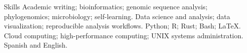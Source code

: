 
\begin{rubric}{Skills}
\entry*[Research]
	Academic writing; bioinformatics; genomic sequence analysis; phylogenomics; microbiology; self-learning.
\entry*[Data]
	Data science and analysis; data visualization; reproducible analysis workflows.
\entry*[Programming]
	Python; R; Rust; Bash; \LaTeX.
\entry*[Systems]
	Cloud computing; high-performance computing; UNIX systems administration.
\entry*[Languages]
	Spanish and English.
\end{rubric}
